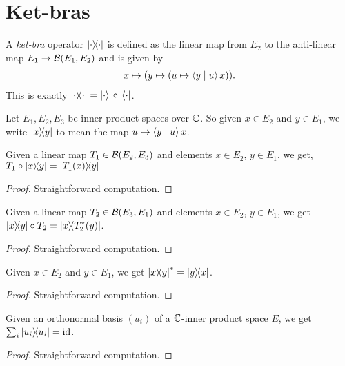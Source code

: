 \section{Ket-bras}
\begin{definition}\label{rankOne}\leanok
  A \textit{ket-bra} operator $\left\lvert\cdot\right\rangle\!\!\left\langle\cdot\right\rvert$ is defined as the linear map from $E_2$ to the anti-linear map $E_1\to\mathcal{B}(E_1,E_2)$ and is given by
  \begin{align*}
    x\mapsto(y\mapsto(u\mapsto\left\langle y \mid u\right\rangle x)).
  \end{align*}
  This is exactly $\left\lvert\cdot\right\rangle\!\!\left\langle\cdot\right\rvert=\left\lvert\cdot\right\rangle\,\circ\,\left\langle\cdot\right\rvert$.
\end{definition}
Let $E_1,E_2,E_3$ be inner product spaces over $\mathbb{C}$.
So given $x\in{E_2}$ and $y\in{E_1}$, we write $\left\lvert x\right\rangle\!\!\left\langle y\right\rvert$ to mean the map $u\mapsto\left\langle y \mid u\right\rangle x$.

 \begin{lemma}\label{linearMap_comp_rankOne}\leanok
  Given a linear map $T_1\in\mathcal{B}(E_2,E_3)$ and elements $x\in E_2$, $y\in{E_1}$, we get, $T_1\circ\left\lvert x\right\rangle\!\!\left\langle y\right\rvert=\left\lvert T_1(x)\right\rangle\!\!\left\langle y\right\rvert$
 \end{lemma}
 \begin{proof}\leanok
  Straightforward computation.
 \end{proof}
 
 \begin{lemma}\label{rankOne_comp_linearMap}\leanok
  Given a linear map $T_2\in\mathcal{B}(E_3,E_1)$ and elements $x\in E_2$, $y\in E_1$, we get $\left\lvert x\right\rangle\!\!\left\langle y\right\rvert\circ T_2=\left\lvert x\right\rangle\!\!\left\langle T_2^*(y)\right\rvert$.
 \end{lemma}
 \begin{proof}\leanok
  Straightforward computation.
 \end{proof}
 
 \begin{lemma}\label{rankOne_adjoint}\leanok
  Given $x\in E_2$ and $y\in E_1$, we get $\left\lvert x\right\rangle\!\!\left\langle y\right\rvert^*=\left\lvert y\right\rangle\!\!\left\langle x\right\rvert$.
 \end{lemma}
 \begin{proof}\leanok
  Straightforward computation.
 \end{proof}

 \begin{lemma}\label{sum_rankOne_onb_eq_id}\leanok
  Given an orthonormal basis $(u_i)$ of a $\mathbb{C}$-inner product space $E$, we get $\sum_i\left\lvert u_i\right\rangle\!\!\left\langle u_i\right\rvert=\operatorname{id}$.
 \end{lemma}
 \begin{proof}\leanok
  Straightforward computation.
 \end{proof}

